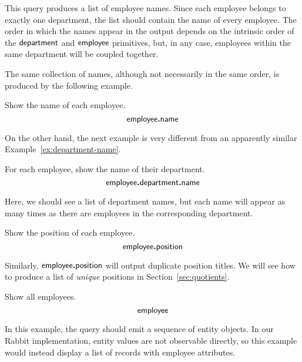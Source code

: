 This query produces a list of employee names.  Since each employee belongs to
exactly one department, the list should contain the name of every employee.
The order in which the names appear in the output depends on the intrinsic
order of the $\textup{\textsf{department}}$ and $\textup{\textsf{employee}}$ primitives, but, in any case,
employees within the same department will be coupled together.

The same collection of names, although not necessarily in the same order, is
produced by the following example.

\begin{demo}
    \label{ex:employee-name}
    Show the name of each employee.
    \begin{equation*}
        \textup{\textsf{employee}}\boldsymbol{.}\textup{\textsf{name}}
    \end{equation*}
\end{demo}

On the other hand, the next example is very different from an apparently
similar Example~\ref{ex:department-name}.

\begin{demo}
    \label{ex:employee-department-name}
    For each employee, show the name of their department.
    \begin{equation*}
        \textup{\textsf{employee}}\boldsymbol{.}\textup{\textsf{department}}\boldsymbol{.}\textup{\textsf{name}}
    \end{equation*}
\end{demo}

Here, we should see a list of department names, but each name will appear as
many times as there are employees in the corresponding department.

\begin{demo}
    \label{ex:employee-position}
    Show the position of each employee.
    \begin{equation*}
        \textup{\textsf{employee}}\boldsymbol{.}\textup{\textsf{position}}
    \end{equation*}
\end{demo}

Similarly, $\textup{\textsf{employee}}\boldsymbol{.}\textup{\textsf{position}}$ will output duplicate position titles.  We
will see how to produce a list of \emph{unique} positions in
Section~\ref{sec:quotients}.

\begin{demo}
    \label{ex:employee}
    Show all employees.
    \begin{equation*}
        \textup{\textsf{employee}}
    \end{equation*}
\end{demo}

In this example, the query should emit a sequence of entity objects.  In our
Rabbit implementation, entity values are not observable directly, so this
example would instead display a list of records with employee attributes.

